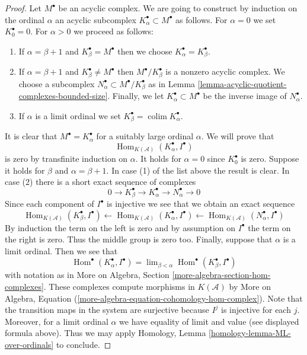 \documentclass[10pt,a4paper]{amsart}
\theoremstyle{plain}
\theoremstyle{definition}
\theoremstyle{remark}
\numberwithin{equation}{subsection}
\def\lim{\mathop{\mathrm{lim}}\nolimits}
\def\colim{\mathop{\mathrm{colim}}\nolimits}
\def\Hom{\mathop{\mathrm{Hom}}\nolimits}
\begin{document}
\begin{proof}
Let $M^\bullet$ be an acyclic complex. We are going to construct by
induction on the ordinal $\alpha$ an acyclic subcomplex
$K_\alpha^\bullet \subset M^\bullet$ as follows.
For $\alpha = 0$ we set $K_0^\bullet = 0$. For $\alpha > 0$
we proceed as follows:
\begin{enumerate}
\item If $\alpha = \beta + 1$ and $K_\beta^\bullet = M^\bullet$
then we choose $K_\alpha^\bullet = K_\beta^\bullet$.
\item If $\alpha = \beta + 1$ and $K_\beta^\bullet \not = M^\bullet$
then $M^\bullet/K_\beta^\bullet$ is a nonzero acyclic complex.
We choose a subcomplex $N_\alpha^\bullet \subset M^\bullet/K_\beta^\bullet$
as in Lemma \ref{lemma-acyclic-quotient-complexes-bounded-size}.
Finally, we let $K_\alpha^\bullet \subset M^\bullet$
be the inverse image of $N_\alpha^\bullet$.
\item If $\alpha$ is a limit ordinal we set
$K_\beta^\bullet = \colim K_\alpha^\bullet$.
\end{enumerate}
It is clear that $M^\bullet = K_\alpha^\bullet$ for a suitably large
ordinal $\alpha$. We will prove that
$$
\Hom_{K(\mathcal{A})}(K_\alpha^\bullet, I^\bullet)
$$
is zero by transfinite induction on $\alpha$. It holds for $\alpha = 0$
since $K_0^\bullet$ is zero. Suppose it holds for $\beta$ and
$\alpha = \beta + 1$. In case (1) of the list above the result is clear.
In case (2) there is a short exact sequence of complexes
$$
0 \to K_\beta^\bullet \to K_\alpha^\bullet \to N_\alpha^\bullet \to 0
$$
Since each component of $I^\bullet$ is injective we see that we obtain
an exact sequence
$$
\Hom_{K(\mathcal{A})}(K_\beta^\bullet, I^\bullet) \leftarrow
\Hom_{K(\mathcal{A})}(K_\alpha^\bullet, I^\bullet) \leftarrow
\Hom_{K(\mathcal{A})}(N_\alpha^\bullet, I^\bullet)
$$
By induction the term on the left is zero and by assumption on $I^\bullet$
the term on the right is zero. Thus the middle group is zero too.
Finally, suppose that $\alpha$ is a limit ordinal. Then we see that
$$
\Hom^\bullet(K_\alpha^\bullet, I^\bullet) =
\lim_{\beta < \alpha} \Hom^\bullet(K_\beta^\bullet, I^\bullet)
$$
with notation as in
More on Algebra, Section \ref{more-algebra-section-hom-complexes}.
These complexes compute morphisms in $K(\mathcal{A})$ by
More on Algebra, Equation
(\ref{more-algebra-equation-cohomology-hom-complex}).
Note that the transition maps in the system are surjective
because $I^j$ is injective for each $j$. Moreover, for a limit
ordinal $\alpha$ we have equality of limit and value
(see displayed formula above). Thus we may apply
Homology, Lemma \ref{homology-lemma-ML-over-ordinals}
to conclude.
\end{proof}
\end{document}
